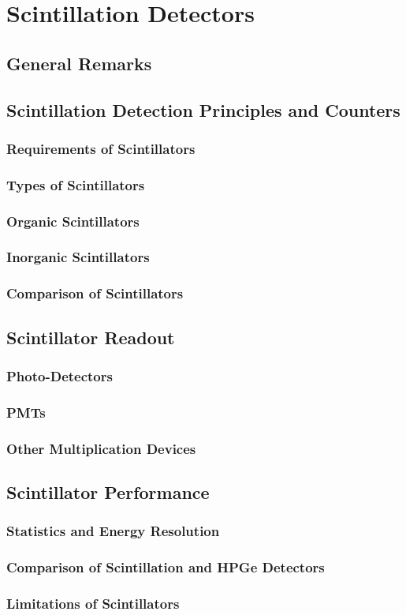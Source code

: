 \section{Scintillation Detectors}
\subsection{General Remarks}
\subsection{Scintillation Detection Principles and Counters}
\subsubsection{Requirements of Scintillators}
\subsubsection{Types of Scintillators}
\subsubsection{Organic Scintillators}
\subsubsection{Inorganic Scintillators}
\subsubsection{Comparison of Scintillators}
\subsection{Scintillator Readout}
\subsubsection{Photo-Detectors}
\subsubsection{PMTs}
\subsubsection{Other Multiplication Devices}
\subsection{Scintillator Performance}
\subsubsection{Statistics and Energy Resolution}
\subsubsection{Comparison of Scintillation and HPGe Detectors}
\subsubsection{Limitations of Scintillators}

